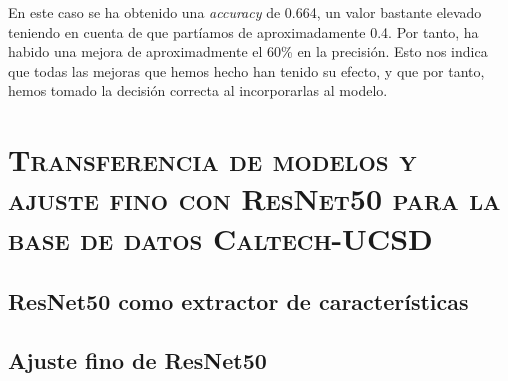 \documentclass[11pt,a4paper]{article}
\begin{document}
En este caso se ha obtenido una \textit{accuracy} de 0.664, un valor bastante elevado teniendo en cuenta
de que partíamos de aproximadamente 0.4. Por tanto, ha habido una mejora de aproximadmente el 60\% en
la precisión. Esto nos indica que todas las mejoras que hemos hecho han tenido su efecto, y que por tanto,
hemos tomado la decisión correcta al incorporarlas al modelo.

\section{\textsc{Transferencia de modelos y ajuste fino con ResNet50 para la base de datos Caltech-UCSD}}

\subsection{ResNet50 como extractor de características}

\subsection{Ajuste fino de ResNet50}

\newpage



\end{document}

